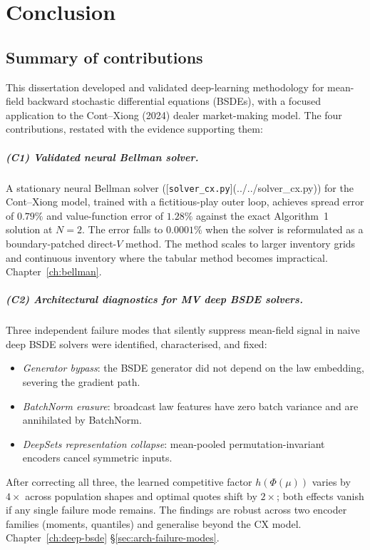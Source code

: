 \chapter{Conclusion}
\label{ch:conclusion}

\section{Summary of contributions}

This dissertation developed and validated deep-learning methodology for mean-field backward stochastic differential equations (BSDEs), with a focused application to the Cont--Xiong (2024) dealer market-making model. The four contributions, restated with the evidence supporting them:

\paragraph{(C1) Validated neural Bellman solver.}  A stationary neural Bellman solver ([\texttt{solver\_cx.py}](../../solver_cx.py)) for the Cont--Xiong model, trained with a fictitious-play outer loop, achieves spread error of $0.79\%$ and value-function error of $1.28\%$ against the exact Algorithm~1 solution at $N = 2$. The error falls to $0.0001\%$ when the solver is reformulated as a boundary-patched direct-$V$ method. The method scales to larger inventory grids and continuous inventory where the tabular method becomes impractical. Chapter~\ref{ch:bellman}.

\paragraph{(C2) Architectural diagnostics for MV deep BSDE solvers.}  Three independent failure modes that silently suppress mean-field signal in naive deep BSDE solvers were identified, characterised, and fixed:
\begin{itemize}[leftmargin=2em]
  \item \emph{Generator bypass}: the BSDE generator did not depend on the law embedding, severing the gradient path.
  \item \emph{BatchNorm erasure}: broadcast law features have zero batch variance and are annihilated by BatchNorm.
  \item \emph{DeepSets representation collapse}: mean-pooled permutation-invariant encoders cancel symmetric inputs.
\end{itemize}
After correcting all three, the learned competitive factor $h(\Phi(\mu))$ varies by $4\times$ across population shapes and optimal quotes shift by $2\times$; both effects vanish if any single failure mode remains. The findings are robust across two encoder families (moments, quantiles) and generalise beyond the CX model. Chapter~\ref{ch:deep-bsde} \S\ref{sec:arch-failure-modes}.

